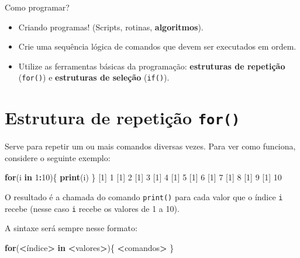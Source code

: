 \documentclass[10pt,a4paper]{book}
\newenvironment{Shaded}{\begin{snugshade}}{\end{snugshade}}
\newcommand{\KeywordTok}[1]{\textcolor[rgb]{0.13,0.29,0.53}{\textbf{#1}}}
\newcommand{\DecValTok}[1]{\textcolor[rgb]{0.00,0.00,0.81}{#1}}
\newcommand{\StringTok}[1]{\textcolor[rgb]{0.31,0.60,0.02}{#1}}
\newcommand{\ControlFlowTok}[1]{\textcolor[rgb]{0.13,0.29,0.53}{\textbf{#1}}}
\newcommand{\OperatorTok}[1]{\textcolor[rgb]{0.81,0.36,0.00}{\textbf{#1}}}
\newcommand{\NormalTok}[1]{#1}
\providecommand{\tightlist}{%
  \setlength{\itemsep}{0pt}\setlength{\parskip}{0pt}}
\begin{document}
Como programar?

\begin{itemize}
\tightlist
\item
  Criando programas! (Scripts, rotinas, \textbf{algoritmos}).
\item
  Crie uma sequência lógica de comandos que devem ser executados em
  ordem.
\item
  Utilize as ferramentas básicas da programação: \textbf{estruturas de
  repetição} (\texttt{for()}) e \textbf{estruturas de seleção}
  (\texttt{if()}).
\end{itemize}

\section{\texorpdfstring{Estrutura de repetição
\texttt{for()}}{Estrutura de repetição for()}}\label{estrutura-de-repetiuxe7uxe3o-for}

Serve para repetir um ou mais comandos diversas vezes. Para ver como
funciona, considere o seguinte exemplo:

\begin{Shaded}
\begin{Highlighting}[]
\ControlFlowTok{for}\NormalTok{(i }\ControlFlowTok{in} \DecValTok{1}\OperatorTok{:}\DecValTok{10}\NormalTok{)\{}
    \KeywordTok{print}\NormalTok{(i)}
\NormalTok{\}}
\NormalTok{[}\DecValTok{1}\NormalTok{] }\DecValTok{1}
\NormalTok{[}\DecValTok{1}\NormalTok{] }\DecValTok{2}
\NormalTok{[}\DecValTok{1}\NormalTok{] }\DecValTok{3}
\NormalTok{[}\DecValTok{1}\NormalTok{] }\DecValTok{4}
\NormalTok{[}\DecValTok{1}\NormalTok{] }\DecValTok{5}
\NormalTok{[}\DecValTok{1}\NormalTok{] }\DecValTok{6}
\NormalTok{[}\DecValTok{1}\NormalTok{] }\DecValTok{7}
\NormalTok{[}\DecValTok{1}\NormalTok{] }\DecValTok{8}
\NormalTok{[}\DecValTok{1}\NormalTok{] }\DecValTok{9}
\NormalTok{[}\DecValTok{1}\NormalTok{] }\DecValTok{10}
\end{Highlighting}
\end{Shaded}

O resultado é a chamada do comando \texttt{print()} para cada valor que
o índice \texttt{i} recebe (nesse caso \texttt{i} recebe os valores de 1
a 10).

A sintaxe será sempre nesse formato:

\begin{Shaded}
\begin{Highlighting}[]
\ControlFlowTok{for}\NormalTok{(}\OperatorTok{<}\NormalTok{índice}\OperatorTok{>}\StringTok{ }\ControlFlowTok{in} \OperatorTok{<}\NormalTok{valores}\OperatorTok{>}\NormalTok{)\{}
    \OperatorTok{<}\NormalTok{comandos}\OperatorTok{>}
\NormalTok{\}}
\end{Highlighting}
\end{Shaded}
\end{document}
